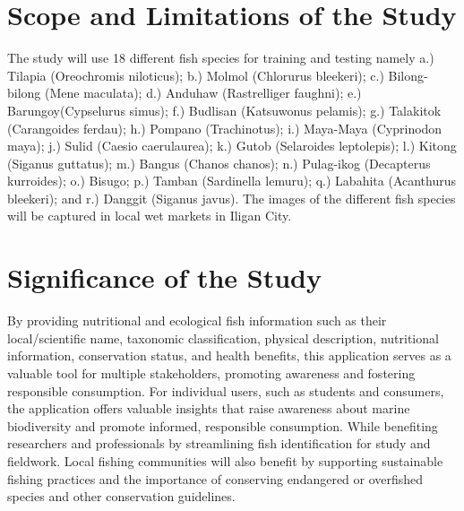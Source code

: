 \section{Scope and Limitations of the Study }
The study will use 18 different fish species for training and testing namely a.) Tilapia (Oreochromis niloticus); b.) Molmol (Chlorurus bleekeri); c.) Bilong-bilong (Mene maculata); d.) Anduhaw (Rastrelliger faughni); e.) Barungoy(Cypselurus simus); f.) Budlisan (Katsuwonus pelamis); g.) Talakitok (Carangoides ferdau); h.) Pompano (Trachinotus); i.) Maya-Maya (Cyprinodon maya); j.) Sulid (Caesio caerulaurea); k.) Gutob (Selaroides leptolepis); l.) Kitong (Siganus guttatus); m.) Bangus (Chanos chanos); n.) Pulag-ikog (Decapterus kurroides); o.) Bisugo; p.) Tamban (Sardinella lemuru); q.) Labahita (Acanthurus bleekeri); and r.) Danggit (Siganus javus). The images of the different fish species will be captured in local wet markets in Iligan City.

\section{Significance of the Study} %
By providing nutritional and ecological fish information such as their local/scientific name, taxonomic classification, physical description, nutritional information, conservation status, and health benefits, this application serves as a valuable tool for multiple stakeholders, promoting awareness and fostering responsible consumption. For individual users, such as students and consumers, the application offers valuable insights that raise awareness about marine biodiversity and promote informed, responsible consumption. While benefiting researchers and professionals by streamlining fish identification for study and fieldwork. Local fishing communities will also benefit by supporting sustainable fishing practices and the importance of conserving endangered or overfished species and other conservation guidelines.
